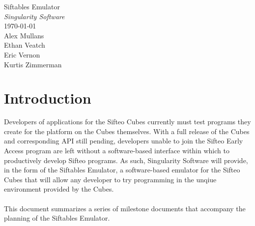 \documentclass[12pt]{article}
\begin{document}
\vspace*{\fill}
        \begin{center}
                \LARGE{Siftables Emulator} \\
                \LARGE{\textit{Singularity Software}} \\
                \vspace{.15in}
                \large{\today} \\
                \vspace{4in}
                        Alex Mullans \\
                        Ethan Veatch \\
                        Eric Vernon \\
                        Kurtis Zimmerman
        \end{center}
\vspace*{\fill}
\thispagestyle{empty}

\clearpage

\tableofcontents

\clearpage

\section{Introduction}
Developers of applications for the \gls{Sifteo Cubes} currently must test programs they create for the platform on the Cubes themselves.  With a full release of the Cubes and corresponding \gls{API} still pending, developers unable to join the Sifteo Early Access program are left without a software-based interface within which to productively develop Sifteo programs. As such, Singularity Software will provide, in the form of the Siftables Emulator, a software-based emulator for the Sifteo Cubes that will allow any developer to try programming in the unqiue environment provided by the Cubes.\\\\
This document summarizes a series of milestone documents that accompany the planning of the Siftables Emulator.
\end{document}
